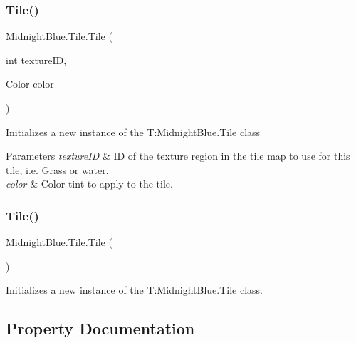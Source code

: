 \subsubsection{\texorpdfstring{Tile()}{Tile()}\hspace{0.1cm}{\footnotesize\ttfamily [1/2]}}
{\footnotesize\ttfamily Midnight\+Blue.\+Tile.\+Tile (\begin{DoxyParamCaption}\item[{int}]{texture\+ID,  }\item[{Color}]{color }\end{DoxyParamCaption})\hspace{0.3cm}{\ttfamily [inline]}}



Initializes a new instance of the T\+:\+Midnight\+Blue.\+Tile class 


\begin{DoxyParams}{Parameters}
{\em texture\+ID} & ID of the texture region in the tile map to use for this tile, i.\+e. Grass or water.\\
\hline
{\em color} & Color tint to apply to the tile.\\
\hline
\end{DoxyParams}
\hypertarget{class_midnight_blue_1_1_tile_af89b11fc577df594ffebd0963e9020d4}{}\label{class_midnight_blue_1_1_tile_af89b11fc577df594ffebd0963e9020d4} 
\subsubsection{\texorpdfstring{Tile()}{Tile()}\hspace{0.1cm}{\footnotesize\ttfamily [2/2]}}
{\footnotesize\ttfamily Midnight\+Blue.\+Tile.\+Tile (\begin{DoxyParamCaption}{ }\end{DoxyParamCaption})\hspace{0.3cm}{\ttfamily [inline]}}



Initializes a new instance of the T\+:\+Midnight\+Blue.\+Tile class. 



\subsection{Property Documentation}
\hypertarget{class_midnight_blue_1_1_tile_a51397c4b6a08c8017a3d5555ed5822c6}{}\label{class_midnight_blue_1_1_tile_a51397c4b6a08c8017a3d5555ed5822c6} 
